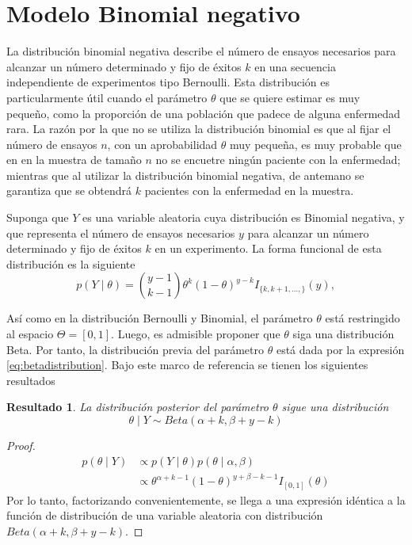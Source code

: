 \documentclass[
  10pt,
  spanish,
]{book}
\newtheorem{proposition}{Resultado}[chapter]
\theoremstyle{definition}
\theoremstyle{definition}
\theoremstyle{definition}
\theoremstyle{definition}
\theoremstyle{remark}
\begin{document}
\hypertarget{modelo-binomial-negativo}{%
\section{Modelo Binomial negativo}\label{modelo-binomial-negativo}}

La distribución binomial negativa describe el número de ensayos necesarios para alcanzar un número determinado y fijo de éxitos \(k\) en una secuencia independiente de experimentos tipo Bernoulli. Esta distribución es particularmente útil cuando el parámetro \(\theta\) que se quiere estimar es muy pequeño, como la proporción de una población que padece de alguna enfermedad rara. La razón por la que no se utiliza la distribución binomial es que al fijar el número de ensayos \(n\), con un aprobabilidad \(\theta\) muy pequeña, es muy probable que en en la muestra de tamaño \(n\) no se encuetre ningún paciente con la enfermedad; mientras que al utilizar la distribución binomial negativa, de antemano se garantiza que se obtendrá \(k\) pacientes con la enfermedad en la muestra.

Suponga que \(Y\) es una variable aleatoria cuya distribución es Binomial negativa, y que representa el número de ensayos necesarios \(y\) para alcanzar un número determinado y fijo de éxitos \(k\) en un experimento. La forma funcional de esta distribución es la siguiente
\begin{equation}
p(Y \mid \theta)=\binom{y-1}{k-1}\theta^k(1-\theta)^{y-k}I_{\{k,k+1,\ldots,\}}(y),
\end{equation}

Así como en la distribución Bernoulli y Binomial, el parámetro \(\theta\) está restringido al espacio \(\Theta=[0,1]\). Luego, es admisible proponer que \(\theta\) siga una distribución Beta. Por tanto, la distribución previa del parámetro \(\theta\) está dada por la expresión \eqref{eq:betadistribution}. Bajo este marco de referencia se tienen los siguientes resultados

\begin{proposition}
\protect\hypertarget{prp:unnamed-chunk-31}{}{\label{prp:unnamed-chunk-31} }La distribución posterior del parámetro \(\theta\) sigue una distribución
\begin{equation*}
\theta \mid Y \sim Beta(\alpha+k,\beta+y-k)
\end{equation*}
\end{proposition}

\begin{proof}
{}\begin{align*}
p(\theta \mid Y)&\propto p(Y \mid \theta)p(\theta \mid \alpha,\beta)\\
&\propto \theta^{\alpha+k-1} (1-\theta)^{y+\beta-k-1}I_{[0,1]}(\theta)
\end{align*}
Por lo tanto, factorizando convenientemente, se llega a una expresión idéntica a la función de distribución de una variable aleatoria con distribución \(Beta(\alpha+k,\beta+y-k)\).
\end{proof}
\end{document}
